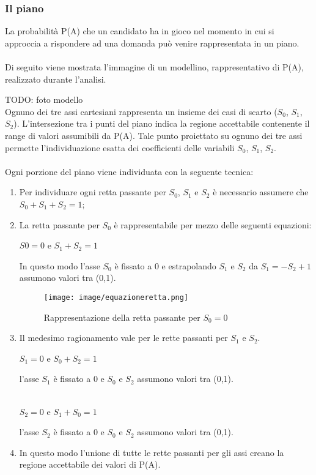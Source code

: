 \documentclass[10pt,a4paper]{article}
\begin{document}
\subsubsection{Il piano}
\label{Il piano}
\noindent
La probabilit\`a P(A) che un candidato ha in gioco nel momento in cui si approccia a rispondere ad una domanda pu\`o venire rappresentata in un piano.\\\\
Di seguito viene mostrata l'immagine di un modellino, rappresentativo di P(A), realizzato durante l'analisi.

TODO: foto modello\\

\noindent
Ognuno dei tre assi cartesiani rappresenta un insieme dei casi di scarto ($S_0$, $S_1$, $S_2$). L'intersezione tra i punti del piano indica la regione accettabile contenente il range di valori assumibili da P(A). Tale punto proiettato su ognuno dei tre assi permette l'individuazione esatta dei coefficienti delle variabili $S_0$, $S_1$, $S_2$.\\\\
Ogni porzione del piano viene individuata con la seguente tecnica:
\begin{enumerate}
\item Per individuare ogni retta passante per $S_0$, $S_1$ e $S_2$ \`e necessario assumere che $S_0+S_1+S_2=1$;
\item La retta passante per $S_0$ \`e rappresentabile per mezzo delle seguenti equazioni:
\begin{center}$S0=0$ e $S_1+S_2=1$\end{center}
In questo modo l'asse $S_0$ \`e fissato a 0 e estrapolando $S_1$ e $S_2$ da $S_1=-S_2+1$  assumono valori tra (0,1). 
\begin{figure}[H]
\centering
	\texttt{[image: image/equazioneretta.png]}
	\caption{Rappresentazione della retta passante per $S_0=0$}
\end{figure}
\item Il medesimo ragionamento vale per le rette passanti per $S_1$ e $S_2$.

\begin{center}$S_1=0$ e $S_0+S_2=1$\end{center}
l'asse $S_1$ \`e fissato a 0 e $S_0$ e $S_2$ assumono valori tra (0,1).\\\\

\begin{center} $S_2=0$ e $S_1+S_0=1$ \end{center}
l'asse $S_2$ \`e fissato a 0 e $S_0$ e $S_2$ assumono valori tra (0,1).

\item In questo modo l'unione di tutte le rette passanti per gli assi creano la regione accettabile dei valori di P(A).
\end{enumerate}
\end{document}
